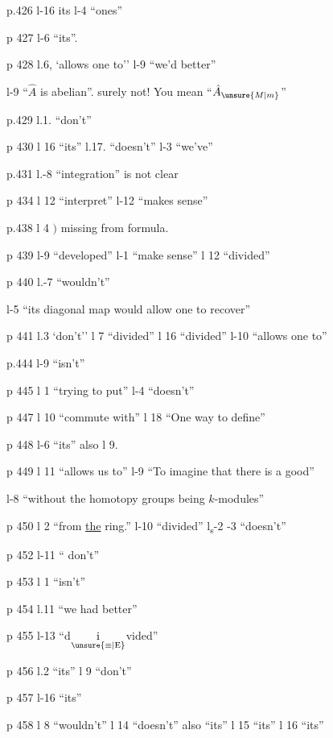 
p.426 l-16 its \quad l-4 ``ones''

p 427 l-6 ``its''.

p 428 l.6, `allows one to'' \quad l-9 ``we'd better''

l-9 ``$\hat{A}$ is abelian''. surely not! You mean ``$\hat{A}_{\unsure{M|m}}$''

p.429 l.1. ``don't''

p 430 l 16 ``its'' \quad l.17. ``doesn't'' \quad l-3 ``we've''

p.431 l.-8 ``integration'' is not clear

p 434 l 12 ``interpret'' \quad l-12 ``makes sense''

p.438 l 4 \mbox{$)$} missing from formula.

p 439 l-9 ``developed'' \quad l-1 ``make sense'' \quad l 12 ``divided''

p 440 l.-7 ``wouldn't'' \quad {} \quad {}\unsure{-+|+}

l-5 ``its diagonal map would allow one to recover''

p 441 l.3 `don't'' \quad l 7 ``divided'' \quad l 16 ``divided'' \quad l-10 ``allows one to''

p.444 l-9 ``isn't''

p 445 l 1 ``trying to put'' \quad l-4 ``doesn't''

p 447 l 10 ``commute with'' \quad l 18 ``One way to define'' \quad {}

p 448 l-6 ``its'' also l 9.

p 449 l 11 ``allows  us to'' \quad l-9 ``To imagine that there is a good''

l-8 ``without the homotopy groups being $k$-modules''

p 450 l 2 ``from \uline{the} ring.'' \quad l-10 ``divided'' \quad l\textsubscript{s}-2  -3 ``doesn't''

p 452 l-11 `` don't''

p 453 l 1 ``isn't''

p 454 l.11 ``we had better''

p 455 l-13 ``d$\underset{\unsure{\equiv|\mathrm{E}}}{\text{i}}$vided''

p 456 l.2 ``its'' \quad l 9 ``don't''

p 457 l-16 ``its''

p 458 l 8 ``wouldn't'' \quad l 14 ``doesn't'' also ``its'' \quad l 15 ``its'' \quad l 16 ``its''

